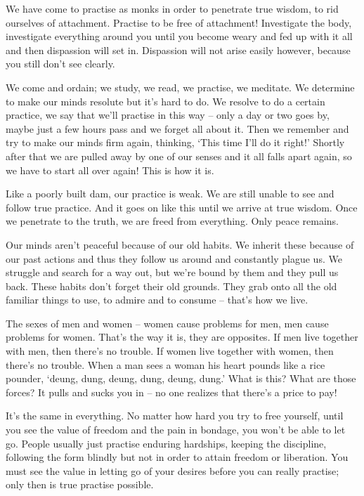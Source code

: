We have come to practise as monks in order to penetrate true wisdom, to rid ourselves of attachment. Practise to be free of attachment! Investigate the body, investigate everything around you until you become weary and fed up with it all and then dispassion will set in. Dispassion will not arise easily however, because you still don't see clearly. 

We come and ordain; we study, we read, we practise, we meditate. We determine to make our minds resolute but it's hard to do. We resolve to do a certain practice, we say that we'll practise in this way -- only a day or two goes by, maybe just a few hours pass and we forget all about it. Then we remember and try to make our minds firm again, thinking, `This time I'll do it right!' Shortly after that we are pulled away by one of our senses and it all falls apart again, so we have to start all over again! This is how it is. 

Like a poorly built dam, our practice is weak. We are still unable to see and follow true practice. And it goes on like this until we arrive at true wisdom. Once we penetrate to the truth, we are freed from everything. Only peace remains. 

Our minds aren't peaceful because of our old habits. We inherit these because of our past actions and thus they follow us around and constantly plague us. We struggle and search for a way out, but we're bound by them and they pull us back. These habits don't forget their old grounds. They grab onto all the old familiar things to use, to admire and to consume -- that's how we live. 

The sexes of men and women -- women cause problems for men, men cause problems for women. That's the way it is, they are opposites. If men live together with men, then there's no trouble. If women live together with women, then there's no trouble. When a man sees a woman his heart pounds like a rice pounder, `deung, dung, deung, dung, deung, dung.' What is this? What are those forces? It pulls and sucks you in -- no one realizes that there's a price to pay! 

It's the same in everything. No matter how hard you try to free yourself, until you see the value of freedom and the pain in bondage, you won't be able to let go. People usually just practise enduring hardships, keeping the discipline, following the form blindly but not in order to attain freedom or liberation. You must see the value in letting go of your desires before you can really practise; only then is true practise possible. 

